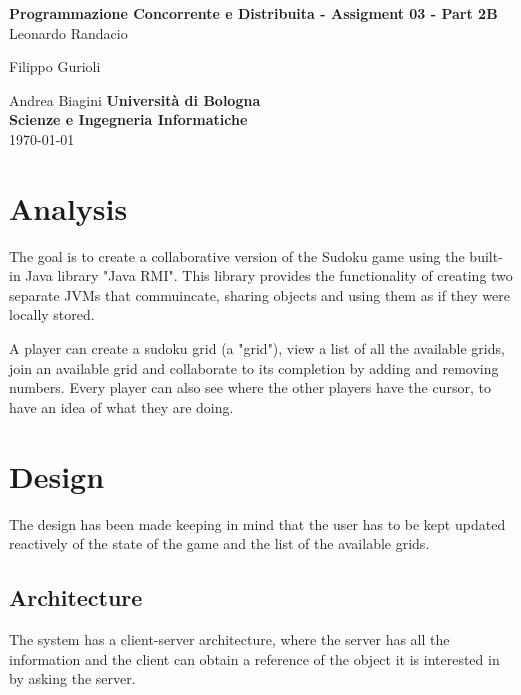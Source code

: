 \documentclass[12pt, a4paper]{report}
\begin{document}
\renewcommand\bibname{References} %


\begin{titlepage}

\begin{center}

\Large \textbf {Programmazione Concorrente e Distribuita - Assigment 03 - Part 2B}\\%
\vspace{1em}%
\vfill
Leonardo Randacio


Filippo Gurioli


Andrea Biagini
\vspace{1em}
\vfill
{\bf Università di Bologna \\ Scienze e Ingegneria Informatiche}\\[0.5in]

       
\vfill
\today

\end{center}

\end{titlepage}


\tableofcontents
\listoffigures

\newpage
{} %

\chapter{Analysis}
The goal is to create a collaborative version of the Sudoku game using the 
 built-in Java library "Java RMI". This library provides the functionality 
 of creating two separate JVMs that commuincate, sharing objects and using them as
 if they were locally stored.

A player can create a sudoku grid (a "grid"), view a list of all the
 available grids, join an available grid and collaborate to its completion
 by adding and removing numbers. Every player can also see where the other
 players have the cursor, to have an idea of what they are doing.

\chapter{Design}
The design has been made keeping in mind that the user has to be kept updated
 reactively of the state of the game and the list of the available grids.

\section{Architecture}
The system has a client-server architecture, where the server has all the
 information and the client can obtain a reference of the object it is
 interested in by asking the server.
\end{document}
